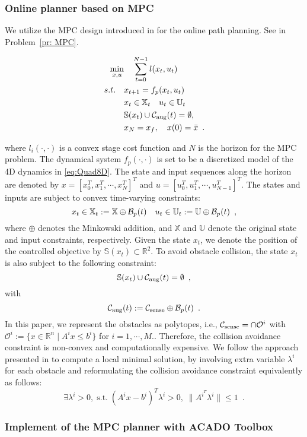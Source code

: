 \subsubsection{Online planner based on MPC}
%
We utilize the MPC design introduced in \cite{zhang_2017_MPC} for the online path planning. See in Problem~\ref{pr: MPC}.
%
\begin{problem}\label{pr: MPC}
\begin{align*}
\min_{x,u}  & \quad \sum^{N-1}_{t=0} l(x_t,u_t)  \\
s.t. \quad &x_{t+1} = f_p(x_t,u_t)\\
& x_t \in \mathbb{X}_t\quad u_t \in \mathbb{U}_t\\
& \mathbb{S}(x_t)\cup\mathcal C_\text{aug}(t) = \emptyset,\\
& x_N = x_f ,\quad x(0) = \bar{x} \enspace.
\end{align*}
\end{problem}
\noindent where $l_i(\cdot,\cdot)$ is a  convex stage cost function and $N$ is the horizon for the MPC problem. The dynamical system $f_p(\cdot,\cdot)$ is set to be a discretized model of the 4D dynamics in \ref{eq:Quad8D}. The state and input sequences along the horizon  are denoted by $x=[x^{T}_0,x^{T}_1,\cdots,x^{T}_N]^{T}$ and $u=[u^{T}_0,u^{T}_1,\cdots,u^{T}_{N-1}]^{T}$. The states and inputs are subject to convex time-varying constraints:
%
\begin{equation}
x_t \in \mathbb{X}_t :=\mathbb{X}\oplus\mathcal B_p(t) \quad u_t \in\mathbb{U}_t := \mathbb{U}\oplus\mathcal B_p(t)  \enspace ,
\end{equation}
%
where $\oplus$ denotes the Minkowski addition, and $\mathbb{X}$ and $\mathbb{U}$ denote the original state and input constraints, respectively. Given the state $x_t$, we denote the position of the controlled objective by $\mathbb{S}(x_t)\subset \mathbb{R}^{2}$. To avoid obstacle collision, the state $x_t$ is also subject to the following constraint: 
%
\begin{equation}
\mathbb{S}(x_t)\cup\mathcal C_\text{aug}(t) = \emptyset \enspace ,
\end{equation}
%
with 
%
\begin{equation}
\mathcal C_\text{aug}(t) := \mathcal C_\text{sense}\oplus\mathcal B_p(t) \enspace .
\end{equation}
%
In this paper, we represent the obstacles as polytopes, i.e., $\mathcal C_\text{sense} = \cap \mathcal{O}^{i}$ with $\mathcal{O}^{i}:= \{x\in\mathbb{R}^{n} \mid A^{i}x\leq b^{i}\}$ for $i = 1,\cdots ,M.$. Therefore, the collision avoidance constraint is non-convex and computationally expensive. We follow the approach presented in \cite{zhang_2017_MPC} to compute a local minimal solution, by involving extra variable $\lambda^{i}$ for each obstacle and reformulating the collision avoidance constraint equivalently as follows: 
%
\begin{equation}
\exists \lambda^{i} >0, \; \mbox{s.t.} \; (A^{i}x- b^{i})^{T}\lambda^{i}  > 0, \; \|A^{i^{T}}\lambda^{i}\|\leq 1\enspace .
\end{equation}
%
\subsubsection{Implement of the MPC planner with ACADO Toolbox}
 